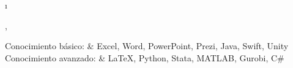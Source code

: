 \documentclass[a4paper,10pt]{article}
\newcommand{\tablength}{}
\newcommand{\setCols}[1]{			%
	\ifnum0=\i						%
		\ifdim0cm=#1				%
			\def \firstCol {r}		%
		\else						%
			\def \firstCol {p{#1}}		%
		\fi						%
	\else \ifnum1=\i				%
		\ifdim0cm=#1				%
			\def \secondCol {l}		%
		\else						%
			\def \secondCol{p{#1}}	%
		\fi						%
	\else \ifnum2=\i				%
		\ifnum0=#1				%
			\def \sep {}			%
		\else						%
			\def \sep {|}			%
		\fi						%
	\fi \fi \fi						%
	\advance\i by1					%
}
\newcommand{\tab}[1]{					%
	\newcount\i						%
	\forlistloop{\setCols}{\tablength}		%
	\begin{tabular}{\firstCol \sep \secondCol}	%
		#1							%
	\end{tabular} \\						%
}
\begin{document}
\tab{
Conocimiento básico:
	& Excel, Word, PowerPoint, Prezi, Java, Swift, Unity 	\\

Conocimiento avanzado:
	& {\LaTeX}, Python, Stata, MATLAB, Gurobi, C\#	\\
}


%		
%		
%		
%		
%		
\end{document}
